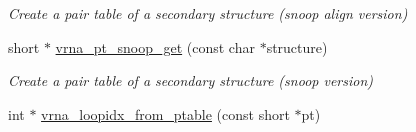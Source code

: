 \begin{DoxyCompactItemize}
\begin{DoxyCompactList}\small\item\em Create a pair table of a secondary structure (snoop align version) \end{DoxyCompactList}\item 
short $\ast$ \hyperlink{group__struct__utils_gaef0f7e1a6c00c81a349973de53039dda}{vrna\+\_\+pt\+\_\+snoop\+\_\+get} (const char $\ast$structure)
\begin{DoxyCompactList}\small\item\em Create a pair table of a secondary structure (snoop version) \end{DoxyCompactList}\item 
\hypertarget{group__struct__utils_ga03e15af299be0866ff21da880c74b92e}{}int $\ast$ \hyperlink{group__struct__utils_ga03e15af299be0866ff21da880c74b92e}{vrna\+\_\+loopidx\+\_\+from\+\_\+ptable} (const short $\ast$pt)\label{group__struct__utils_ga03e15af299be0866ff21da880c74b92e}


\end{DoxyCompactItemize}
